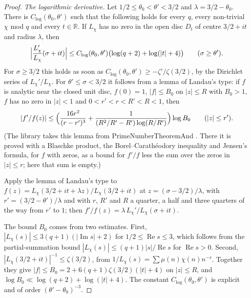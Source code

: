 \documentclass[11pt]{article}
\numberwithin{equation}{section}
\begin{document}
\begin{proof}
\emph{The logarithmic derivative.} Let $1/2 \le \theta_0 < \theta' < 3/2$ and $\lambda = 3/2 - \theta_0$. There is
$C_{\log}(\theta_0, \theta')$ such that the following holds for every $q$, every non-trivial $\chi$ mod $q$ and every
$t \in \mathbb R$. If $L_\chi$ has no zero in the open disc $D_t$ of centre $3/2 + it$ and radius $\lambda$, then
\begin{equation}\label{eq:logderiv}
  \Bigl|\frac{L_\chi'}{L_\chi}(\sigma + it)\Bigr| \le C_{\log}(\theta_0, \theta') \bigl(\log(q + 2) + \log(|t| +
  4)\bigr) \qquad (\sigma \ge \theta').
\end{equation}
For $\sigma \ge 3/2$ this holds as soon as $C_{\log}(\theta_0, \theta') \ge -\zeta'/\zeta(3/2)$, by the Dirichlet series
of $L_\chi'/L_\chi$. For $\theta' \le \sigma < 3/2$ it follows from a lemma of Landau's type: if $f$ is analytic near
the closed unit disc, $f(0) = 1$, $|f| \le B_0$ on $|z| \le R$ with $B_0 > 1$, $f$ has no zero in $|z| < 1$ and
$0 < r' < r < R' < R < 1$, then
\[
  |f'/f(z)| \le \Bigl(\frac{16 r^2}{(r - r')^3} + \frac1{(R^2/R' - R') \log(R/R')}\Bigr) \log B_0 \qquad (|z| \le r').
\]
(The library takes this lemma from PrimeNumberTheoremAnd \cite{pnt-plus}. There it is proved with a Blaschke product,
the Borel--Carath\'eodory inequality and Jensen's formula, for $f$ with zeros, as a bound for $f'/f$ less the sum over
the zeros in $|z| \le r$; here that sum is empty.)

Apply the lemma of Landau's type to $f(z) = L_\chi(3/2 + it + \lambda z)/L_\chi(3/2 + it)$ at
$z = (\sigma - 3/2)/\lambda$, with $r' = (3/2 - \theta')/\lambda$ and with $r$, $R'$ and $R$ a quarter, a half and
three quarters of the way from $r'$ to $1$; then $f'/f(z) = \lambda \, L_\chi'/L_\chi(\sigma + it)$.

The bound $B_0$ comes from two estimates. First,
$|L_\chi(s)| \le 3(q + 1)(|\operatorname{Im} s| + 2)$ for $1/2 \le \operatorname{Re} s \le 3$, which follows from the
partial-summation bound $|L_\chi(s)| \le (q + 1)|s|/\operatorname{Re} s$ for $\operatorname{Re} s > 0$. Second,
$|L_\chi(3/2 + it)|^{-1} \le \zeta(3/2)$, from $1/L_\chi(s) = \sum \mu(n) \chi(n) n^{-s}$. Together they give
$|f| \le B_0 = 2 + 6(q + 1)\zeta(3/2)(|t| + 4)$ on $|z| \le R$, and $\log B_0 \ll \log(q + 2) + \log(|t| + 4)$. The
constant $C_{\log}(\theta_0, \theta')$ is explicit and of order $(\theta' - \theta_0)^{-3}$.


\end{proof}
\end{document}
